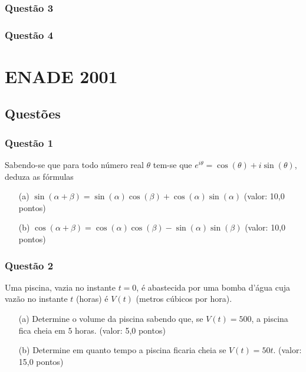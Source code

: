 \documentclass{report}
\begin{document}
\subsection{\color{red} Quest\~ao 3}

\subsection{\color{red} Quest\~ao 4}

\chapter{ENADE 2001}

\section{\color{blue} Quest\~oes}

\subsection{\color{blue} Quest\~ao 1}

Sabendo-se que para todo n\'umero real $\theta$ tem-se que $e^{i\theta}= \cos (\theta) + i \sin (\theta)$, deduza as f\'ormulas

\begin{enumerate}

\item[(a)] $\sin (\alpha + \beta) = \sin (\alpha) \cos (\beta) + \cos (\alpha) \sin (\alpha)$ (valor: 10,0 pontos)

\item[(b)] $\cos (\alpha + \beta) = \cos (\alpha) \cos (\beta) - \sin (\alpha) \sin (\beta)$ (valor: 10,0 pontos)

\end{enumerate}

\subsection{\color{blue} Quest\~ao 2}

Uma piscina, vazia no instante $t = 0$, \'e abastecida por uma bomba d’\'agua cuja vaz\~ao no instante $t$ (horas) \'e $V(t)$ (metros c\'ubicos por hora).

\begin{enumerate}

\item[(a)] Determine o volume da piscina sabendo que, se $V(t) = 500$, a piscina fica cheia em $5$ horas. (valor: 5,0 pontos)

\item[(b)] Determine em quanto tempo a piscina ficaria cheia se $V(t) = 50 t$. (valor: 15,0 pontos)

\end{enumerate}
\end{document}
